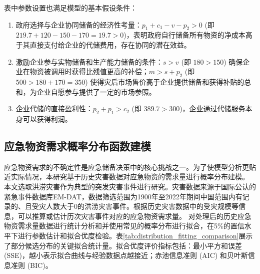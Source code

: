 \documentclass[a4paper,8pt,twocolumn]{article} %
\begin{document}
\begin{table}[htbp]
\centering
\caption{算例参数设置}
\label{tab:parameters_setting}
\end{table}
表中参数设置也满足模型的基本假设条件：
\begin{enumerate}
    \item 政府选择与企业协同储备的经济性考量：$p_1 + c_1 - v - p_2 > 0$ (即 $219.7 + 120 - 150 - 170 = 19.7 > 0$)，表明政府自行储备所有物资的净成本高于其直接支付给企业的代储费用，存在协同的潜在效益。
    \item 激励企业参与实物储备和生产能力储备的条件：$s > v$ (即 $180 > 150$) 确保企业在物资被调用时获得比残值更高的补偿；$m > s + p_2$ (即 $500 > 180 + 170 = 350$) 使得灾后市场售价高于企业提供储备和获得补贴的总和，为企业自愿参与提供了一定的市场参照。
    \item 企业代储的直接盈利性：$p_2 + p_1 > c_2$ (即 $389.7 > 300$)，企业通过代储服务本身可以获得利润。
\end{enumerate}

\subsection{应急物资需求概率分布函数建模}
应急物资需求的不确定性是应急储备决策中的核心挑战之一。为了使模型分析更贴近实际情况，本研究基于历史灾害数据对应急物资的需求量进行概率分布建模。
本文选取洪涝灾害作为典型的突发灾害事件进行研究。灾害数据来源于国际公认的紧急事件数据库EM-DAT，数据筛选范围为1900年至2022年期间中国范围内有记录的、且受灾人数大于0的洪涝灾害事件。根据历史灾害数据中的受灾规模等信息，可以推算或估计历次灾害事件对应的应急物资需求量。
对处理后的历史应急物资需求量数据进行统计分析和并使用常见的概率分布进行拟合，在5\%的置信水平下进行参数估计和拟合优度检验。表\ref{tab:distribution_fitting_comparison}展示了部分候选分布的关键拟合统计量。拟合优度评价指标包括：最小平方和误差 (SSE)，越小表示拟合曲线与经验数据点越接近；赤池信息准则 (AIC) 和贝叶斯信息准则 (BIC)。
\end{document}
